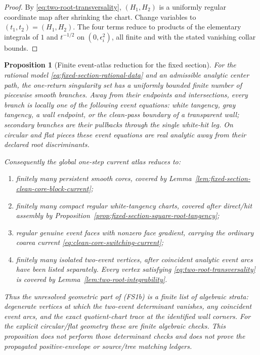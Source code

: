 \documentclass[11pt]{article}
\newtheorem{proposition}[theorem]{Proposition}
\begin{document}
\begin{proof}
By \eqref{eq:two-root-transversality}, $(H_1,H_2)$ is a uniformly regular
coordinate map after shrinking the chart.  Change variables to
$(t_1,t_2)=(H_1,H_2)$.  The four terms reduce to products of the elementary
integrals of $1$ and $t^{-1/2}$ on $(0,\epsilon_i^2)$, all finite and with
the stated vanishing collar bounds.
\end{proof}

\begin{proposition}[Finite event-atlas reduction for the fixed section]
\label{prop:fixed-section-finite-event-atlas}
For the rational model \eqref{eq:fixed-section-rational-data} and an
admissible analytic center path, the one-return singularity set has a
uniformly bounded finite number of piecewise smooth branches.  Away from
their endpoints and intersections, every branch is locally one of the
following event equations: white tangency, gray tangency, a wall endpoint,
or the clean-pass boundary of a transparent wall; secondary branches are
their pullbacks through the single white-hit leg.  On circular and flat
pieces these event equations are real analytic away from their declared
root discriminants.

Consequently the global one-step current atlas reduces to:
\begin{enumerate}[label=\textup{(FA\arabic*)}]
\item finitely many persistent smooth cores, covered by
Lemma~\ref{lem:fixed-section-clean-core-block-current};
\item finitely many compact regular white-tangency charts, covered after
direct/hit assembly by
Proposition~\ref{prop:fixed-section-square-root-tangency};
\item regular genuine event faces with nonzero face gradient, carrying the
ordinary coarea current \eqref{eq:clean-core-switching-current};
\item finitely many isolated two-event vertices, after coincident analytic
event arcs have been listed separately.  Every vertex satisfying
\eqref{eq:two-root-transversality} is covered by
Lemma~\ref{lem:two-root-integrability}.
\end{enumerate}
Thus the unresolved geometric part of \textup{(FS1b)} is a finite list of
algebraic strata: degenerate vertices at which the two-event determinant
vanishes, any coincident event arcs, and the exact quotient-chart trace at
the identified wall corners.  For the explicit circular/flat geometry these
are finite algebraic checks.  This
proposition does not perform those determinant checks and does not prove the
propagated positive-envelope or source/tree matching ledgers.
\end{proposition}
\end{document}
